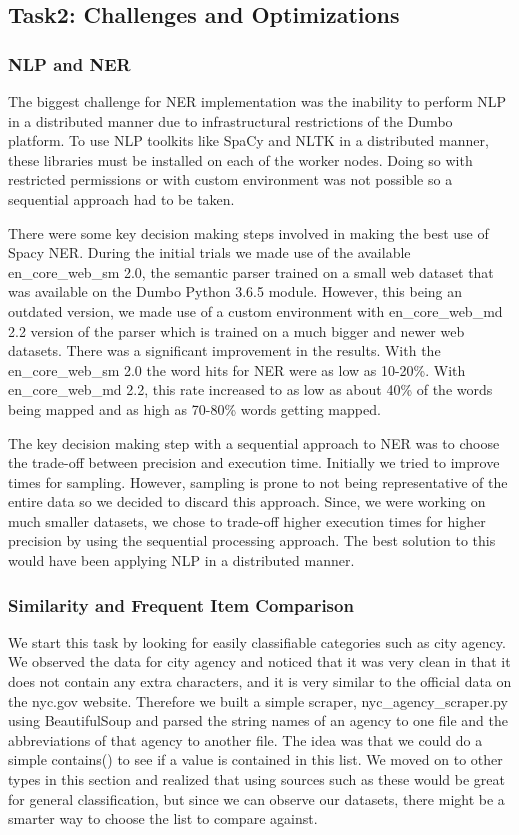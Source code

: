 \documentclass[sigconf,authordraft]{acmart}
\begin{document}
\subsection{Task2: Challenges and Optimizations}
\subsubsection{NLP and NER}
The biggest challenge for NER implementation was the inability to perform NLP in a distributed manner due to infrastructural restrictions of the Dumbo platform. To use NLP toolkits like SpaCy and NLTK in a distributed manner, these libraries must be installed on each of the worker nodes. Doing so with restricted permissions or with custom environment was not possible so a sequential approach had to be taken.

There were some key decision making steps involved in making the best use of Spacy NER. During the initial trials we made use of the available en\_core\_web\_sm 2.0, the semantic parser trained on a small web dataset that was available on the Dumbo Python 3.6.5 module. However, this being an outdated version, we made use of a custom  environment with en\_core\_web\_md 2.2 version of the parser which is trained on a much bigger and newer web datasets. There was a significant improvement in the results. With the en\_core\_web\_sm 2.0 the word hits for NER were as low as 10-20\%. With en\_core\_web\_md 2.2, this rate increased to as low as about 40\% of the words being mapped and as high as 70-80\% words getting mapped.

The key decision making step with a sequential approach to NER was to choose the trade-off between precision and execution time. Initially we tried to improve times for sampling. However, sampling is prone to not being representative of the entire data so we decided to discard this approach. Since, we were working on much smaller datasets, we chose to trade-off higher execution times for higher precision by using the sequential processing approach. The best solution to this would have been applying NLP in a distributed manner.

\subsubsection{Similarity and Frequent Item Comparison}
We start this task by looking for easily classifiable categories such as city agency. We observed the data for city agency and noticed that it was very clean in that it does not contain any extra characters, and it is very similar to the official data on the nyc.gov website. Therefore we built a simple scraper, nyc\_agency\_scraper.py using BeautifulSoup and parsed the string names of an agency to one file and the abbreviations of that agency to another file. The idea was that we could do a simple contains() to see if a value is contained in this list. We moved on to other types in this section and realized that using sources such as these would be great for general classification, but since we can observe our datasets, there might be a smarter way to choose the list to compare against. 
 
\end{document}
